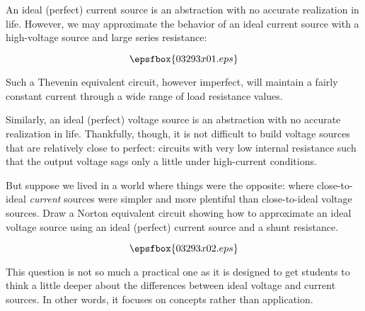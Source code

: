 

An ideal (perfect) current source is an abstraction with no accurate realization in life.  However, we may approximate the behavior of an ideal current source with a high-voltage source and large series resistance:

$$\epsfbox{03293x01.eps}$$

Such a Thevenin equivalent circuit, however imperfect, will maintain a fairly constant current through a wide range of load resistance values.

\vskip 10pt

Similarly, an ideal (perfect) voltage source is an abstraction with no accurate realization in life.  Thankfully, though, it is not difficult to build voltage sources that are relatively close to perfect: circuits with very low internal resistance such that the output voltage sags only a little under high-current conditions.

But suppose we lived in a world where things were the opposite: where close-to-ideal {\it current} sources were simpler and more plentiful than close-to-ideal voltage sources.  Draw a Norton equivalent circuit showing how to approximate an ideal voltage source using an ideal (perfect) current source and a shunt resistance.







$$\epsfbox{03293x02.eps}$$







This question is not so much a practical one as it is designed to get students to think a little deeper about the differences between ideal voltage and current sources.  In other words, it focuses on concepts rather than application.




